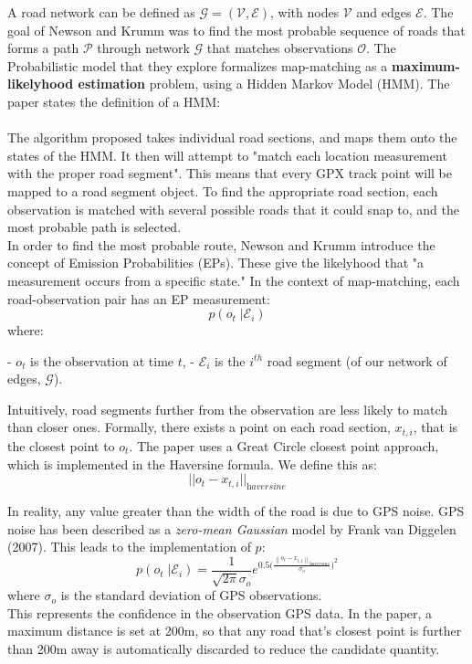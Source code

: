 \documentclass[12pt,a4paper]{report}
\begin{document}
A road network can be defined as $\mathcal{G} = (\mathcal{V}, \mathcal{E})$, with nodes $\mathcal{V}$ and edges $\mathcal{E}$. The goal of Newson and Krumm
was to find the most probable sequence of roads that forms a path $\mathcal{P}$ through network $\mathcal{G}$ that matches observations $\mathcal{O}$.
The Probabilistic model that they explore formalizes map-matching as a \textbf{maximum-likelyhood estimation} problem, using a Hidden Markov Model (HMM).
The paper states the definition of a HMM:\\
\\
The algorithm proposed takes individual road sections, and maps them onto the states of the HMM. It then will attempt to "match each location measurement
with the proper road segment".  This means that every GPX track point will be mapped to a road segment object.
To find the appropriate road section, each observation is matched with several possible roads that it could snap to, and the most probable path is
selected.\\
In order to find the most probable route, Newson and Krumm introduce the concept of Emission Probabilities (EPs). These give the likelyhood that "a measurement occurs from a specific state."
In the context of map-matching, each road-observation pair has an EP measurement:
\[
	p(o_t \;| \mathcal{E}_i)
\]
where:
\begin{itemize}
	- $o_t$ is the observation at time $t$,
	- $\mathcal{E}_i$ is the $i^{th}$ road segment (of our network of edges, $\mathcal{G}$).
\end{itemize}
Intuitively, road segments further from the observation are less likely to match than closer ones.
Formally, there exists a point on each road section, $x_{t,i}$, that is the closest point to $o_t$.
The paper uses a Great Circle closest point approach, which is implemented in the Haversine formula.
We define this as:
\[
	||o_t - x_{t,i}||_{\textit{haversine}}
\]

In reality, any value greater than the width of the road is due to GPS noise. GPS noise has been described as a \textit{zero-mean Gaussian} model by Frank van Diggelen (2007).
This leads to the implementation of $p$:
\[
	p(o_t \;| \mathcal{E}_i) = \frac{1}{\sqrt{2\pi}\sigma_o}e^{0.5\bigg(\frac{\left\|o_t - x_{t,i}\right\|_{\textit{haversine}}}{\sigma_o}\bigg)^2}
\]
where $\sigma_o$ is the standard deviation of GPS observations.\\
This represents the confidence in the observation GPS data.
In the paper, a maximum distance is set at 200m, so that any road that's closest point is further than 200m away is automatically discarded to reduce the candidate quantity.
\end{document}
